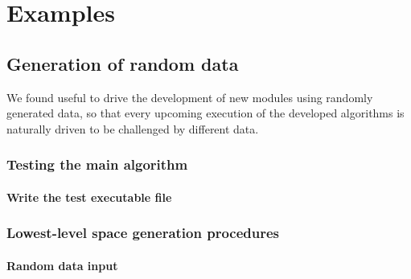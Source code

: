\documentclass[11pt,oneside]{article}	%
\begin{document}
\section{Examples}
\subsection{Generation of random data}

We found useful to drive the development of new modules using randomly generated data, so that every upcoming execution of the developed algorithms is naturally driven to be challenged by different data.

\subsubsection{Testing the main algorithm}

\paragraph{Write the test executable file}




\subsubsection{Lowest-level space generation procedures}

\paragraph{Random data input} 
\end{document}
